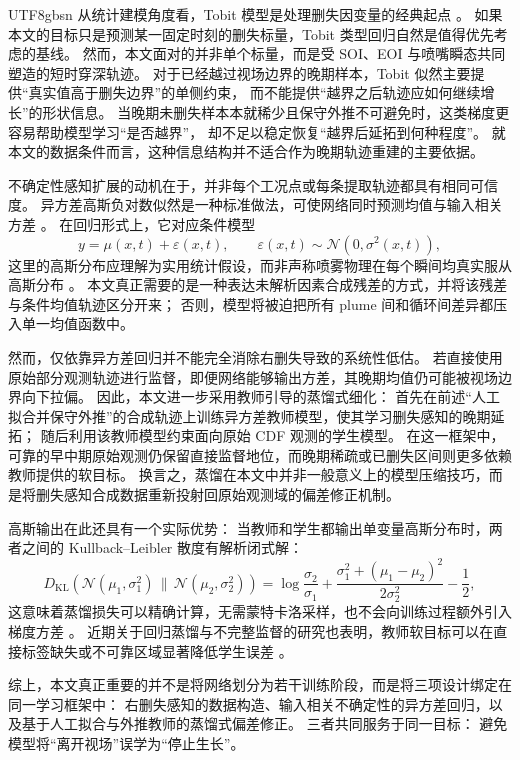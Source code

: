 \documentclass[english, 12pt, a4paper, elec, utf8, a-2b, online]{aaltothesis}
\begin{document}
\begin{CJK*}{UTF8}{gbsn}
从统计建模角度看，Tobit 模型是处理删失因变量的经典起点 \cite{Tobin1958}。
如果本文的目标只是预测某一固定时刻的删失标量，Tobit 类型回归自然是值得优先考虑的基线。
然而，本文面对的并非单个标量，而是受 SOI、EOI 与喷嘴瞬态共同塑造的短时穿深轨迹。
对于已经越过视场边界的晚期样本，Tobit 似然主要提供``真实值高于删失边界''的单侧约束，
而不能提供``越界之后轨迹应如何继续增长''的形状信息。
当晚期未删失样本本就稀少且保守外推不可避免时，这类梯度更容易帮助模型学习``是否越界''，
却不足以稳定恢复``越界后延拓到何种程度''。
就本文的数据条件而言，这种信息结构并不适合作为晚期轨迹重建的主要依据。

不确定性感知扩展的动机在于，并非每个工况点或每条提取轨迹都具有相同可信度。
异方差高斯负对数似然是一种标准做法，可使网络同时预测均值与输入相关方差 \cite{KendallGal2017}。
在回归形式上，它对应条件模型
\[
y=\mu(x,t)+\varepsilon(x,t),\qquad \varepsilon(x,t)\sim \mathcal{N}(0,\sigma^2(x,t)),
\]
这里的高斯分布应理解为实用统计假设，而非声称喷雾物理在每个瞬间均真实服从高斯分布 \cite{BishopPRML2006,KendallGal2017}。
本文真正需要的是一种表达未解析因素合成残差的方式，并将该残差与条件均值轨迹区分开来；
否则，模型将被迫把所有 plume 间和循环间差异都压入单一均值函数中。

然而，仅依靠异方差回归并不能完全消除右删失导致的系统性低估。
若直接使用原始部分观测轨迹进行监督，即便网络能够输出方差，其晚期均值仍可能被视场边界向下拉偏。
因此，本文进一步采用教师引导的蒸馏式细化：
首先在前述``人工拟合并保守外推''的合成轨迹上训练异方差教师模型，使其学习删失感知的晚期延拓；
随后利用该教师模型约束面向原始 CDF 观测的学生模型。
在这一框架中，可靠的早中期原始观测仍保留直接监督地位，而晚期稀疏或已删失区间则更多依赖教师提供的软目标。
换言之，蒸馏在本文中并非一般意义上的模型压缩技巧，而是将删失感知合成数据重新投射回原始观测域的偏差修正机制。

高斯输出在此还具有一个实际优势：
当教师和学生都输出单变量高斯分布时，两者之间的 Kullback--Leibler 散度有解析闭式解：
\[
D_{\mathrm{KL}}\!\left(\mathcal{N}(\mu_1,\sigma_1^2)\,\|\,\mathcal{N}(\mu_2,\sigma_2^2)\right)
=\log\frac{\sigma_2}{\sigma_1}+\frac{\sigma_1^2+(\mu_1-\mu_2)^2}{2\sigma_2^2}-\frac{1}{2},
\]
这意味着蒸馏损失可以精确计算，无需蒙特卡洛采样，也不会向训练过程额外引入梯度方差
\cite{BishopPRML2006,KendallGal2017}。
近期关于回归蒸馏与不完整监督的研究也表明，教师软目标可以在直接标签缺失或不可靠区域显著降低学生误差
\cite{HintonVinyalsDean2015,TarvainenValpola2017,KangKang2024KDRegression}。

综上，本文真正重要的并不是将网络划分为若干训练阶段，而是将三项设计绑定在同一学习框架中：
右删失感知的数据构造、输入相关不确定性的异方差回归，以及基于人工拟合与外推教师的蒸馏式偏差修正。
三者共同服务于同一目标：
避免模型将``离开视场''误学为``停止生长''。


\end{CJK*}
\end{document}
